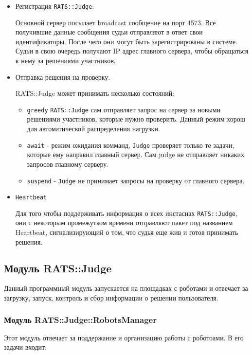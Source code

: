 \documentclass[a4paper,12pt]{article}
\begin{document}
\begin{itemize}
    \item Регистрация \verb+RATS::Judge+:
    
    Основной сервер посылает broadcast сообщение на порт 4573. Все получившие данные сообщения судьи отправляют в ответ свои идентификаторы. После чего они могут быть зарегистрированы в системе. Судьи в свою очередь получают IP адрес главного сервера, чтобы обращаться к нему за решениями участников.
    
    \item Отправка решения на проверку.
    
    RATS::Judge может принимать несколько состояний:
    \begin{itemize}
        \item \verb+greedy+ \verb+RATS::Judge+ сам отправляет запрос на сервер за новыми решениями участников, которые нужно проверить. Данный режим хорош для автоматической распределения нагрузки. 
        \item \verb+await+ - режим ожидания комманд, \verb+Judge+ проверяет только те задачи, которые ему направил главный сервер. Сам judge не отправляет никаких запросов главному серверу. 
        \item \verb+suspend+ - \verb+Judge+ не принимает запросы на проверку от главного сервера. 
    \end{itemize}
    
    \item \verb+Heartbeat+
    
    Для того чтобы поддерживать информация о всех инстаснах \verb+RATS::Judge+, они с некоторым промежутком времени отправляют пакет под названием Heartbeat, сигнализирующий о том, что судья еще жив и готов принимать решения.
\end{itemize}

\subsection{Модуль RATS::Judge}
Данный программный модуль запускается на площадках с роботами и отвечает за загрузку, запуск, контроль и сбор информации о решении пользователя.

\subsubsection{Модуль RATS::Judge::RobotsManager}
Этот модуль отвечает за поддержание и организацию работы с роботоами. В его задачи входит:
\end{document}
